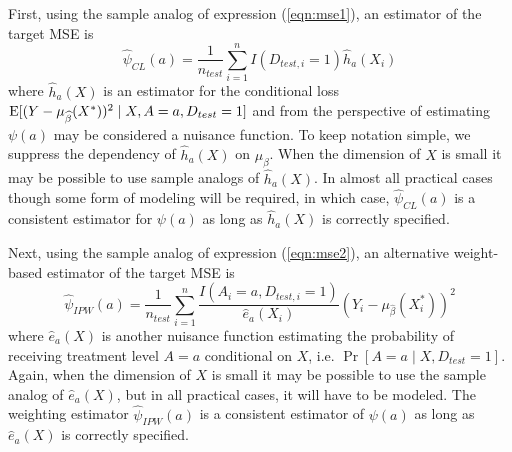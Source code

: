 First, using the sample analog of expression (\ref{eqn:mse1}), an estimator of the target MSE is 
\begin{equation}\label{eqn:cl_estimator}
    \widehat{\psi}_{CL}(a) = \frac{1}{n_{test}} \sum_{i=1}^nI(D_{test, i} = 1)\widehat{h}_a(X_i)
\end{equation}
where $\widehat{h}_a(X)$ is an estimator for the conditional loss $\operatorname{E}[(Y - \mu_{\widehat{\beta}}(X^*))^2 \mid X, A=a, D_{test} = 1]$ and from the perspective of estimating $\psi(a)$ may be considered a nuisance function. To keep notation simple, we suppress the dependency of $\widehat{h}_a(X)$ on $\mu_{\widehat{\beta}}$. When the dimension of $X$ is small it may be possible to use sample analogs of $\widehat{h}_a(X)$. In almost all practical cases though some form of modeling will be required, in which case, $\widehat{\psi}_{CL}(a)$ is a consistent estimator for $\psi(a)$ as long as $\widehat{h}_a(X)$ is correctly specified.

Next, using the sample analog of expression (\ref{eqn:mse2}), an alternative weight-based estimator of the target MSE is 
\begin{equation}\label{eqn:ipw_estimator}
    \widehat{\psi}_{IPW}(a) = \frac{1}{n_{test}} \sum_{i=1}^n \frac{I(A_i = a, D_{test, i} = 1)}{\widehat{e}_a(X_i)}(Y_i - \mu_{\widehat{\beta}}(X^*_i))^2
\end{equation}
where $\widehat{e}_a(X)$ is another nuisance function estimating the probability of receiving treatment level $A = a$ conditional on $X$, i.e. $\Pr[A = a \mid X, D_{test} = 1]$. Again, when the dimension of $X$ is small it may be possible to use the sample analog of $\widehat{e}_a(X)$, but in all practical cases, it will have to be modeled. The weighting estimator $\widehat{\psi}_{IPW}(a)$ is a consistent estimator of $\psi(a)$ as long as $\widehat{e}_a(X)$ is correctly specified.


